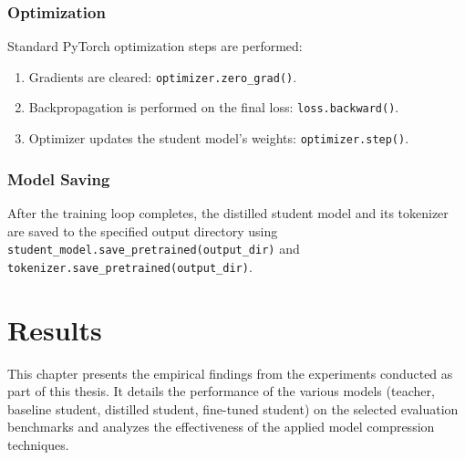 \documentclass[12pt, a4paper]{report}
\begin{document}
\subsection{Optimization}
Standard PyTorch optimization steps are performed:
\begin{enumerate}
    \item Gradients are cleared: \texttt{optimizer.zero\_grad()}.
    \item Backpropagation is performed on the final loss: \texttt{loss.backward()}.
    \item Optimizer updates the student model's weights: \texttt{optimizer.step()}.
\end{enumerate}

\subsection{Model Saving}
After the training loop completes, the distilled student model and its tokenizer are saved to the specified output directory using \texttt{student\_model.save\_pretrained(output\_dir)} and \texttt{tokenizer.save\_pretrained(output\_dir)}.


\chapter{Results}
\label{chap:results}
This chapter presents the empirical findings from the experiments conducted as part of this thesis. It details the performance of the various models (teacher, baseline student, distilled student, fine-tuned student) on the selected evaluation benchmarks and analyzes the effectiveness of the applied model compression techniques.
\end{document}
